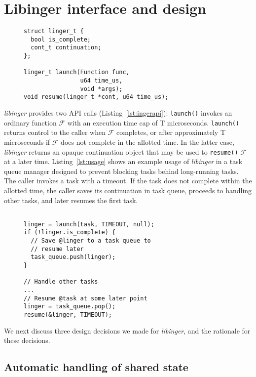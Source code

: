 \section{Libinger interface and design}

\begin{figure}
\begin{lstlisting}[label=lst:ingerapi,caption=Preemptible functions interface]
struct linger_t {
  bool is_complete;
  cont_t continuation;
};

linger_t launch(Function func,
                u64 time_us,
                void *args);
void resume(linger_t *cont, u64 time_us);
\end{lstlisting}
\end{figure}

\textit{libinger} provides two API calls (Listing~\ref{lst:ingerapi}): \texttt{launch()}
invokes an ordinary function $\mathcal{F}$ with an execution time cap of T
microseconds. \texttt{launch()} returns control to the caller when $\mathcal{F}$
completes,
or after approximately T microseconds if $\mathcal{F}$ does not complete in the
allotted time. In the latter case, \textit{libinger} returns an opaque
continuation object that may be used to \texttt{resume()} $\mathcal{F}$ at a
later time. Listing~\ref{lst:usage} shows an example usage of \textit{libinger}
in a task queue manager designed to prevent blocking tasks behind long-running
tasks. The caller invokes a task with a timeout. If the task does not complete
within the allotted time, the caller saves its continuation in task queue,
proceeds to handling other tasks, and later resumes the first task. 

\begin{figure}
\begin{lstlisting}[label=lst:usage, caption=Preemptible function usage example]

linger = launch(task, TIMEOUT, null);
if (!linger.is_complete) {
  // Save @linger to a task queue to
  // resume later
  task_queue.push(linger);
}

// Handle other tasks
...
// Resume @task at some later point
linger = task_queue.pop();
resume(&linger, TIMEOUT);
\end{lstlisting}
\end{figure}

We next discuss three design decisions we made for \textit{libinger}, and the
rationale for these decisions.

\subsection{Automatic handling of shared state}


